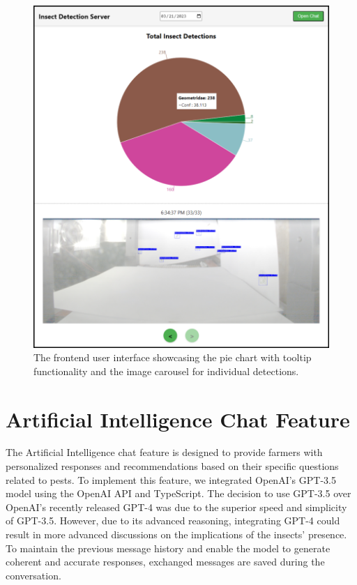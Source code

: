 \begin{figure}[H]
\begin{center}
\includegraphics[width=1.0\linewidth]{Honors_Thesis/Figures/4.7.png}
\end{center}
\caption{The frontend user interface showcasing the pie chart with tooltip functionality and the image carousel for individual detections.}
\label{fig:4.7}
\end{figure}

\section{Artificial Intelligence Chat Feature}

The Artificial Intelligence chat feature is designed to provide farmers with personalized responses and recommendations based on their specific questions related to pests. To implement this feature, we integrated OpenAI's GPT-3.5 model using the OpenAI API and TypeScript. The decision to use GPT-3.5 over OpenAI's recently released GPT-4 was due to the superior speed and simplicity of GPT-3.5. However, due to its advanced reasoning, integrating GPT-4 could result in more advanced discussions on the implications of the insects' presence. To maintain the previous message history and enable the model to generate coherent and accurate responses, exchanged messages are saved during the conversation. 


